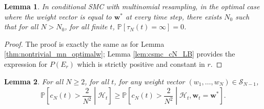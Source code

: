 \documentclass{article}
\newtheorem{lemma}{Lemma}
\newcommand{\PR}{\mathbb{P}}
\begin{document}
 
\begin{lemma}\label{thm:nontrivial_csmc_optimalw}
In conditional SMC with multinomial resampling, in the optimal case where the weight vector is equal to $\mathbf{w}^*$ at every time step, there exists $N_0$ such that for all $N>N_0$, for all finite $t$, $\PR[\tau_N(t) = \infty] =0$.
\end{lemma}

\begin{proof}
The proof is exactly the same as for Lemma \ref{thm:nontrivial_mn_optimalw}; Lemma \ref{lem:csmc_cN_LB} provides the expression for $P(E_r)$ which is strictly positive and constant in $r$.
\end{proof}


\begin{lemma}\label{lem:csmc_optimal_w}
For all $N\geq 2$, for all $t$, for any weight vector $(w_1, \dots, w_N) \in \mathcal{S}_{N-1}$,
\begin{equation*}
\PR \left[c_N(t) > \frac{2}{N^2} \middle| \mathcal{H}_t \right]
\geq \PR \left[c_N(t) > \frac{2}{N^2} \middle| \mathcal{H}_t, \mathbf{w}_t = \mathbf{w}^* \right].
\end{equation*}
\end{lemma}
\end{document}
